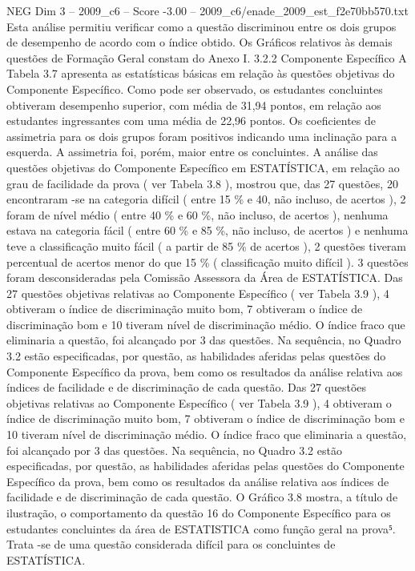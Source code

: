 \begin{textsample}{NEG Dim 3 – 2009\_c6 – Score -3.00 – 2009\_c6/enade\_2009\_est\_f2e70bb570.txt}
Esta análise permitiu verificar como a questão discriminou entre os dois grupos de desempenho de acordo com o índice obtido.
Os Gráficos relativos às demais questões de Formação Geral constam do Anexo I. 3.2.2 Componente Específico A Tabela 3.7 apresenta as estatísticas básicas em relação às questões objetivas do Componente Específico.
Como pode ser observado, os estudantes concluintes obtiveram desempenho superior, com média de 31,94 pontos, em relação aos estudantes ingressantes com uma média de 22,96 pontos.
Os coeficientes de assimetria para os dois grupos foram positivos indicando uma inclinação para a esquerda.
A assimetria foi, porém, maior entre os concluintes.
A análise das questões objetivas do Componente Específico em ESTATÍSTICA, em relação ao grau de facilidade da prova ( ver Tabela 3.8 ), mostrou que, das 27 questões, 20 encontraram -se na categoria difícil ( entre 15 \% e 40, não incluso, de acertos ), 2 foram de nível médio ( entre 40 \% e 60 \%, não incluso, de acertos ), nenhuma estava na categoria fácil ( entre 60 \% e 85 \%, não incluso, de acertos ) e nenhuma teve a classificação muito fácil ( a partir de 85 \% de acertos ), 2 questões tiveram percentual de acertos menor do que 15 \% ( classificação muito difícil ). 3 questões foram desconsideradas pela Comissão Assessora da Área de ESTATÍSTICA.
Das 27 questões objetivas relativas ao Componente Específico ( ver Tabela 3.9 ), 4 obtiveram o índice de discriminação muito bom, 7 obtiveram o índice de discriminação bom e 10 tiveram nível de discriminação médio.
O índice fraco que eliminaria a questão, foi alcançado por 3 das questões.
Na sequência, no Quadro 3.2 estão especificadas, por questão, as habilidades aferidas pelas questões do Componente Específico da prova, bem como os resultados da análise relativa aos índices de facilidade e de discriminação de cada questão.
Das 27 questões objetivas relativas ao Componente Específico ( ver Tabela 3.9 ), 4 obtiveram o índice de discriminação muito bom, 7 obtiveram o índice de discriminação bom e 10 tiveram nível de discriminação médio.
O índice fraco que eliminaria a questão, foi alcançado por 3 das questões.
Na sequência, no Quadro 3.2 estão especificadas, por questão, as habilidades aferidas pelas questões do Componente Específico da prova, bem como os resultados da análise relativa aos índices de facilidade e de discriminação de cada questão.
O Gráfico 3.8 mostra, a título de ilustração, o comportamento da questão 16 do Componente Específico para os estudantes concluintes da área de ESTATISTICA como função geral na prova⁵.
Trata -se de uma questão considerada difícil para os concluintes de ESTATÍSTICA.

\end{textsample}
